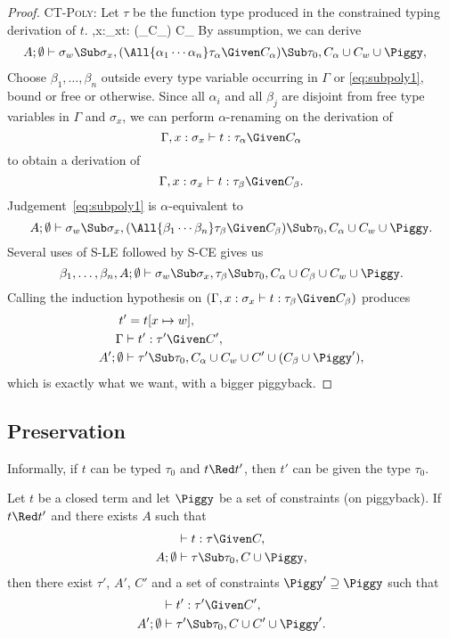 \documentclass{amsart}
\theoremstyle{definition}
\begin{document}
\begin{proof}
\Case\textsc{CT-Poly}: Let $\tau$ be the function type produced
in the constrained typing derivation of $t$.
{\Gamma,x:\sigma_x\vdash t:
(\tau_\alpha\Given C_\alpha)
\Given C_\alpha}
%
By assumption, we can derive
\begin{align}
A;\Exigent &\vdash \sigma_w\Sub\sigma_x,
(\All{\alpha_1\cdots\alpha_n}\tau_\alpha\Given
C_\alpha)\Sub\tau_0,
C_\alpha\cup C_w\cup\Piggy,
\label{eq:subpoly1}
\end{align}
Choose $\beta_1,\ldots,\beta_n$ outside every type variable
occurring in $\Gamma$ or \eqref{eq:subpoly1}, bound or free or
otherwise. Since all $\alpha_i$ and all $\beta_j$ are disjoint
from free type variables in $\Gamma$ and $\sigma_x$, we can
perform $\alpha$-renaming on the derivation of
\[
\Gamma,x:\sigma_x\vdash t : \tau_\alpha\Given C_\alpha
\]
to obtain a derivation of
\def\tBeta{\Gamma,x:\sigma_x\vdash t : \tau_\beta\Given C_\beta}
\[
\tBeta.
\]
Judgement~\eqref{eq:subpoly1} is $\alpha$-equivalent to
\[
A;\Exigent \vdash \sigma_w\Sub\sigma_x,
(\All{\beta_1\cdots\beta_n}\tau_\beta\Given
C_\beta)\Sub\tau_0,
C_\alpha\cup C_w\cup\Piggy.
\]
Several uses of \textsc{S-LE} followed by \textsc{S-CE} gives us
\[
\beta_1,\ldots,\beta_n,A;\Exigent \vdash \sigma_w\Sub\sigma_x,
\tau_\beta\Sub\tau_0,
C_\alpha\cup C_\beta\cup C_w\cup\Piggy.
\]
Calling the induction hypothesis on $(\tBeta)$ produces
\begin{align}
t&'=t[x\mapsto\Xdef],\notag\\
\Gamma&\vdash t':\tau'\Given C',
\label{eq:subpoly2}
\\
A';\Exigent&\vdash
\tau'\Sub\tau_0,
C_\alpha\cup C_w\cup C'\cup(C_\beta\cup\Piggy'),
\label{eq:subpoly3}
\end{align}
which is exactly what we want, with a bigger piggyback.
\end{proof}

\subsection{Preservation}
\label{preservation}

Informally, if $t$ can be typed $\tau_0$ and $t\Red t'$,
then $t'$ can be given the type $\tau_0$.

Let $t$ be a closed term and let $\Piggy$ be a set of constraints
(on piggyback). If $t\Red t'$ and there exists $A$ such that
\begin{align*}
&\vdash t:\tau \Given C,\\
A;\emptyset&\vdash \tau\Sub\tau_0,C\cup\Piggy,
\end{align*}
then there exist $\tau'$, $A'$, $C'$ and a set of constraints
$\Piggy'\supseteq\Piggy$ such that
\begin{align*}
&\vdash t':\tau'\Given C',\\
A';\emptyset&\vdash \tau'\Sub\tau_0,C\cup C'\cup\Piggy'.
\end{align*}
\end{document}
